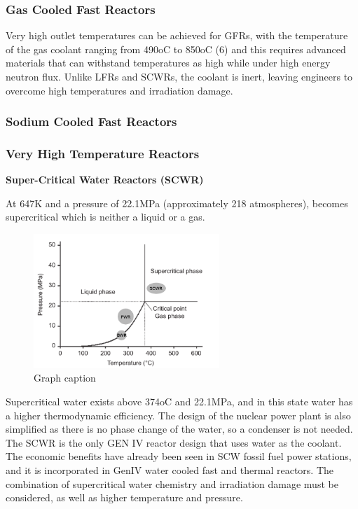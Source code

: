 \subsubsection{Gas Cooled Fast Reactors}

Very high outlet temperatures can be achieved for GFRs, with the temperature of the gas coolant ranging from 490oC to 850oC (6) and this requires advanced materials that can withstand temperatures as high while under high energy neutron flux.  Unlike LFRs and SCWRs, the coolant is inert, leaving engineers to overcome high temperatures and irradiation damage. 



\subsubsection{Sodium Cooled Fast Reactors}




\subsubsection{Very High Temperature Reactors}




\textbf{Super-Critical Water Reactors (SCWR)}

At 647K and a pressure of 22.1MPa (approximately 218 atmospheres), becomes supercritical which is neither a liquid or a gas\cite{advancedbiomass}.

\begin{figure}[tbp]
  \begin{center}
    \includegraphics[width=7.0cm]{chapters/introduction/images/water_phase_diagram.png}
    \caption{Graph caption}
    \label{image:flux1}
  \end{center}
\end{figure}


Supercritical water exists above 374oC and 22.1MPa, and in this state water has a higher thermodynamic efficiency.  The design of the nuclear power plant is also simplified as there is no phase change of the water, so a condenser is not needed.  The SCWR is the only GEN IV reactor design that uses water as the coolant\cite{gen4}.  The economic benefits have already been seen in SCW fossil fuel power stations, and it is incorporated in GenIV water cooled fast and thermal reactors.  The combination of supercritical water chemistry and irradiation damage must be considered, as well as higher temperature and pressure.

